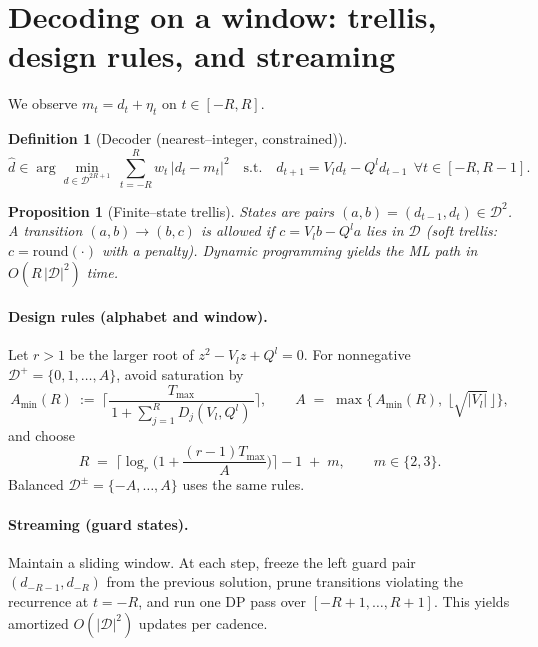 \documentclass[11pt]{article}
\newtheorem{proposition}[theorem]{Proposition}
\theoremstyle{definition}
\newtheorem{definition}[theorem]{Definition}
\theoremstyle{remark}
\begin{document}
\section{Decoding on a window: trellis, design rules, and streaming}
We observe $m_t=d_t+\eta_t$ on $t\in[-R,R]$.
\begin{definition}[Decoder (nearest--integer, constrained)]\label{def:decoder}
\begin{equation}\label{eq:decoder}
\hat d \in \arg\min_{d\in\mathcal D^{2R+1}} \ \sum_{t=-R}^{R} w_t\,|d_t - m_t|^2
\quad \text{s.t.}\quad d_{t+1}=V_l d_t - Q^l d_{t-1}\ \ \forall t\in[-R,R-1].
\end{equation}
\end{definition}
\begin{proposition}[Finite--state trellis]\label{prop:trellis}
States are pairs $(a,b)=(d_{t-1},d_t)\in\mathcal D^2$.
A transition $(a,b)\to (b,c)$ is allowed if $c=V_l b - Q^l a$ lies in $\mathcal D$ (soft trellis: $c=\mathrm{round}(\cdot)$ with a penalty).
Dynamic programming yields the ML path in $O(R\,|\mathcal D|^2)$ time.
\end{proposition}

\paragraph{Design rules (alphabet and window).}
Let $r>1$ be the larger root of $z^2-V_l z+Q^l=0$.
For nonnegative $\mathcal D^+=\{0,1,\dots,A\}$, avoid saturation by
\begin{equation}\label{eq:Amin}
A_{\min}(R)\ :=\ \Big\lceil \frac{T_{\max}}{\,1+\sum_{j=1}^{R} D_j(V_l,Q^l)\,} \Big\rceil,\qquad
A \;=\; \max\!\Big\{\,A_{\min}(R),\ \big\lfloor \sqrt{|V_l|}\,\big\rfloor \Big\},
\end{equation}
and choose
\begin{equation}\label{eq:Rchoice}
R \;=\; \Big\lceil \log_r\!\Big(1+\frac{(r-1)T_{\max}}{A}\Big)\Big\rceil - 1 \;+\; m,\qquad m\in\{2,3\}.
\end{equation}
Balanced $\mathcal D^\pm=\{-A,\dots,A\}$ uses the same rules.

\paragraph{Streaming (guard states).}
Maintain a sliding window. At each step, freeze the left guard pair $(d_{-R-1},d_{-R})$ from the previous solution,
prune transitions violating the recurrence at $t=-R$, and run one DP pass over $[-R{+}1,\dots,R{+}1]$.
This yields amortized $O(|\mathcal D|^2)$ updates per cadence.
\end{document}
